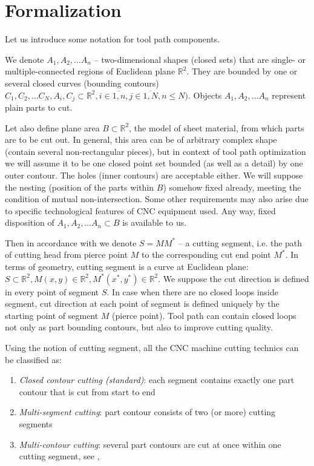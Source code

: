 \documentclass{ifacconf}
\begin{document}
\section{Formalization}

Let us introduce some notation for tool path components.

We denote $A_1, A_2, \dots A_n$ -- two-dimensional shapes
(closed sets)
that are single- or multiple-connected
regions of Euclidean plane
$\mathbb R^2$.
They are bounded by one or several closed curves
(bounding contours)
$C_1, C_2, \dots C_N,
A_i, C_j \subset \mathbb R^2,
i \in \overline{1, n},
j \in \overline{1, N},
n \leqslant N)$.
Objects $A_1, A_2, \dots A_n$
represent plain parts to cut.

Let also define plane area
$B \subset \mathbb R^2$,
the model of
sheet material, from which parts are to be cut out.
In general,
this area can be of arbitrary complex shape
(contain several non-rectangular pieces),
but in context of tool path optimization
we will assume it to be
one closed point set bounded
(as well as a detail) by one outer contour.
The holes
(inner contours) are acceptable either.
We will suppose the nesting
(position of the parts within $B$)
somehow fixed already,
meeting the condition of
mutual non-intersection.
Some other requirements may also arise
due to specific technological features
of CNC equipment used.
Any way,
fixed disposition of
$A_1, A_2, \dots A_n \subset B$
is available to us.

Then
in accordance with \cite{Petunin2015Nov}
we denote $S=MM^*$ -- a cutting segment,
i.e. the path of cutting head
from pierce point $M$
to the corresponding cut end point $M^*$.
In terms of geometry,
cutting segment is a curve at Euclidean plane:
$S \subset \mathbb R^2,
M(x,y) \in \mathbb R^2,
M^*(x^*,y^*) \in \mathbb R^2$.
We suppose
the cut direction is defined
in every point of segment $S$.
In case when there are no
closed loops inside segment,
cut direction at each point of segment
is defined uniquely by the starting
point of segment $M$
(pierce point).
Tool path can contain closed loops
not only as part bounding contours,
but also to improve cutting quality.

Using the notion of cutting segment,
all the CNC machine cutting technics
can be classified as:
\begin{enumerate}
    \item \textit{Closed contour cutting (standard)}:
    each segment contains exactly one part contour
    that is cut from start to end
    \item \textit{Multi-segment cutting}:
    part contour consists of two (or more) cutting segments
    \item \textit{Multi-contour cutting}:
    several part contours are cut at once within one cutting segment,
    see
    \cite{Makarovskikh2018Feb},
    \cite{ufa2017}
\end{enumerate}
\end{document}
